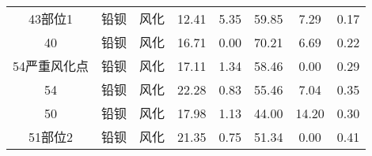 \documentclass[withoutpreface,bwprint]{cumcmthesis} %
\begin{document}
\begin{appendices}
\begin{table}[!h]
\begin{tabular}{@{}cccccccc@{}}
		43部位1                                                     & 铅钡          & 风化                                                       & 12.41                                                          & 5.35                                                         & 59.85                                                        & 7.29                                                         & 0.17                                                            \\
		40                                                        & 铅钡          & 风化                                                       & 16.71                                                          & 0.00                                                         & 70.21                                                        & 6.69                                                         & 0.22                                                            \\
		54严重风化点                                                   & 铅钡          & 风化                                                       & 17.11                                                          & 1.34                                                         & 58.46                                                        & 0.00                                                         & 0.29                                                            \\
		54                                                        & 铅钡          & 风化                                                       & 22.28                                                          & 0.83                                                         & 55.46                                                        & 7.04                                                         & 0.35                                                            \\
		50                                                        & 铅钡          & 风化                                                       & 17.98                                                          & 1.13                                                         & 44.00                                                        & 14.20                                                        & 0.30                                                            \\
		51部位2                                                     & 铅钡          & 风化                                                       & 21.35                                                          & 0.75                                                         & 51.34                                                        & 0.00                                                         & 0.41                                                            \\

\end{tabular}
\end{table}
\end{appendices}
\end{document}
